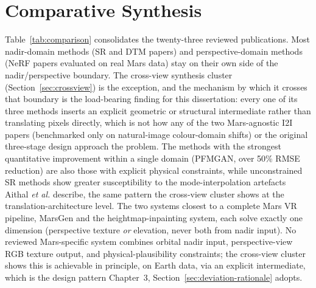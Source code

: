 \section{Comparative Synthesis}

Table~\ref{tab:comparison} consolidates the twenty-three reviewed publications. Most nadir-domain methods (SR and DTM papers) and perspective-domain methods (NeRF papers evaluated on real Mars data) stay on their own side of the nadir/perspective boundary. The cross-view synthesis cluster (Section~\ref{sec:crossview}) is the exception, and the mechanism by which it crosses that boundary is the load-bearing finding for this dissertation: every one of its three methods inserts an explicit geometric or structural intermediate rather than translating pixels directly, which is not how any of the two Mars-agnostic I2I papers (benchmarked only on natural-image colour-domain shifts) or the original three-stage design approach the problem. The methods with the strongest quantitative improvement within a single domain (PFMGAN, over 50\% RMSE reduction) are also those with explicit physical constraints, while unconstrained SR methods show greater susceptibility to the mode-interpolation artefacts Aithal \textit{et al.} describe, the same pattern the cross-view cluster shows at the translation-architecture level. The two systems closest to a complete Mars VR pipeline, MarsGen and the heightmap-inpainting system, each solve exactly one dimension (perspective texture \emph{or} elevation, never both from nadir input). No reviewed Mars-specific system combines orbital nadir input, perspective-view RGB texture output, and physical-plausibility constraints; the cross-view cluster shows this is achievable in principle, on Earth data, via an explicit intermediate, which is the design pattern Chapter~3, Section~\ref{sec:deviation-rationale} adopts.

